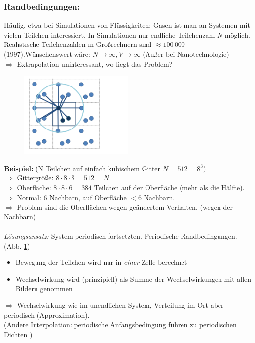 \documentclass[12pt]{article}
\begin{document}
\subsubsection*{Randbedingungen:}
Häufig, etwa bei Simulationen von Flüssigkeiten; Gasen ist man an Systemen mit vielen Teilchen interessiert. In Simulationen nur endliche Teilchenzahl $N$ möglich. Realistische Teilchenzahlen in Großrechnern sind $\approx 100 \, 000$ (1997).Wünschenswert wäre: $N \to \infty, V \to \infty$ (Außer bei Nanotechnologie) \\
$\Rightarrow$ Extrapolation uninteressant, wo liegt das Problem? \\

\begin{figure}[ht]
\centering
\includegraphics[width=0.5\textwidth]{Folie73.png}
	\caption{}
	\label{fig:Gittah}
\end{figure}

\textbf{Beispiel:}  (N Teilchen auf einfach kubischem Gitter $N = 512 = 8^3$) \\
$\Rightarrow$ Gittergröße: $ 8 \cdot 8 \cdot 8 = 512=N$ \\
$\Rightarrow$ Oberfläche: $8 \cdot 8 \cdot 6 = 384$ Teilchen auf der Oberfläche (mehr als die Hälfte). \\
$\Rightarrow$ Normal: $6$ Nachbarn, auf Oberfläche $<6$ Nachbarn. \\
$\Rightarrow$ Problem sind die Oberflächen wegen geändertem Verhalten. (wegen der Nachbarn)\\ \\
 \textit{Lösungsansatz:} System periodisch fortsetzten. Periodische Randbedingungen. (Abb. \ref{fig:Gittah})
\begin{itemize}
\item Bewegung der Teilchen wird nur in \textit{einer} Zelle berechnet
\item Wechselwirkung wird (prinzipiell) als Summe der Wechselwirkungen mit allen Bildern genommen
\end{itemize}
$\Rightarrow$ Wechselwirkung wie im unendlichen System, Verteilung im Ort aber periodisch (Approximation). \\
(Andere Interpolation: periodische Anfangsbedingung führen zu periodischen Dichten %
) \\
\end{document}
